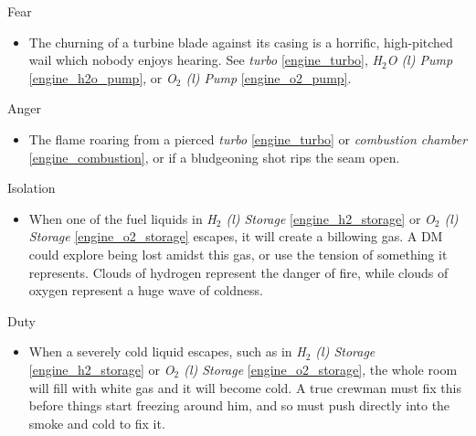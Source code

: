 \documentclass[a4paper]{article}
\begin{document}
\vspace{0.3cm}
\begin{minipage}[t]{0.4\linewidth}
Fear
\begin{itemize}
\item The churning of a turbine blade against its casing is a horrific, high-pitched wail which nobody enjoys hearing. See \textit{turbo} \ref{engine_turbo}, \textit{H$_2$O (l) Pump} \ref{engine_h2o_pump}, or \textit{O$_2$ (l) Pump} \ref{engine_o2_pump}.
\end{itemize}
\end{minipage} 
\begin{minipage}[t]{0.4\linewidth}
Anger
\begin{itemize}
\item The flame roaring from a pierced \textit{turbo} \ref{engine_turbo} or \textit{combustion chamber} \ref{engine_combustion}, or if a bludgeoning shot rips the seam open. 
\end{itemize}
\end{minipage}

\begin{minipage}[t]{0.4\linewidth}
Isolation
\begin{itemize}
\item When one of the fuel liquids in \textit{H$_2$ (l) Storage} \ref{engine_h2_storage} or \textit{O$_2$ (l) Storage} \ref{engine_o2_storage} escapes, it will create a billowing gas. A DM could explore being lost amidst this gas, or use the tension of something it represents. Clouds of hydrogen represent the danger of fire, while clouds of oxygen represent a huge wave of coldness. 
\end{itemize}
\end{minipage}
\begin{minipage}[t]{0.4\linewidth}
Duty
\begin{itemize}
\item When a severely cold liquid escapes, such as in \textit{H$_2$ (l) Storage} \ref{engine_h2_storage} or \textit{O$_2$ (l) Storage} \ref{engine_o2_storage}, the whole room will fill with white gas and it will become cold. A true crewman must fix this before things start freezing around him, and so must push directly into the smoke and cold to fix it.
\end{itemize}
\end{minipage}
 
\end{document}
